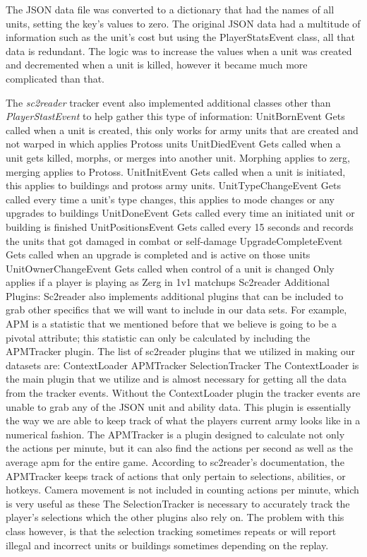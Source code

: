 \documentclass[a4paper,12pt]{report}
\begin{document}
The JSON data file was converted to a dictionary that had the names of all units, setting the key’s values to zero. The original JSON data had a multitude of information such as the unit’s cost but using the PlayerStatsEvent class, all that data is redundant. The logic was to increase the values when a unit was created and decremented when a unit is killed, however it became much more complicated than that. 

The \textit{sc2reader} tracker event also implemented additional classes other than \textit{PlayerStastEvent} to help gather this type of information:
UnitBornEvent
Gets called when a unit is created, this only works for army units that are created and not warped in which applies Protoss units
UnitDiedEvent
Gets called when a unit gets killed, morphs, or merges into another unit. Morphing applies to zerg, merging applies to Protoss. 
UnitInitEvent
Gets called when a unit is initiated, this applies to buildings and protoss army units.
UnitTypeChangeEvent
Gets called every time a unit’s type changes, this applies to mode changes or any upgrades to buildings
UnitDoneEvent
Gets called every time an initiated unit or building is finished
UnitPositionsEvent
Gets called every 15 seconds and records the units that got damaged in combat or self-damage
UpgradeCompleteEvent
Gets called when an upgrade is completed and is active on those units
UnitOwnerChangeEvent
Gets called when control of a unit is changed
Only applies if a player is playing as Zerg in 1v1 matchups 
Sc2reader Additional Plugins:
Sc2reader also implements additional plugins that can be included to grab other specifics that we will want to include in our data sets. For example, APM is a statistic that we mentioned before that we believe is going to be a pivotal attribute; this statistic can only be calculated by including the APMTracker plugin. The list of  sc2reader plugins that we utilized in making our datasets are:
ContextLoader
APMTracker
SelectionTracker
The ContextLoader is the main plugin that we utilize and is almost necessary for getting all the data from the tracker events. Without the ContextLoader plugin the tracker events are unable to grab any of the JSON unit and ability data. This plugin is essentially the way we are able to keep track of what the players current army looks like in a numerical fashion.
The APMTracker is a plugin designed to calculate not only the actions per minute, but it can also find the actions per second as well as the average apm for the entire game. According to sc2reader’s documentation, the APMTracker keeps track of actions that only pertain to selections, abilities, or hotkeys. Camera movement is not included in counting actions per minute, which is very useful as these 
The SelectionTracker is necessary to accurately track the player’s selections which the other plugins also rely on. The problem with this class however, is that the selection tracking sometimes repeats or will report illegal and incorrect units or buildings sometimes depending on the replay.
\end{document}
